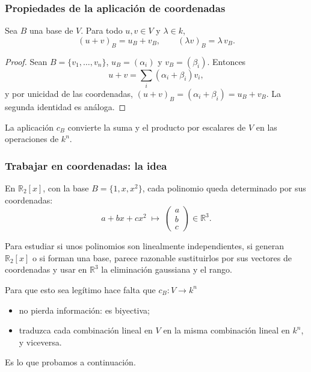 \begin{frame}
    \frametitle{Propiedades de la aplicación de coordenadas}

    \begin{proposition}
        Sea $B$ una base de $V$.
        Para todo $u,v\in V$ y $\lambda\in k$,
        \[
            (u+v)_B=u_B+v_B,
            \qquad
            (\lambda v)_B=\lambda\,v_B.
        \]
    \end{proposition}

    \begin{proof}
        Sean $B=\{v_1,\ldots,v_n\}$, $u_B=(\alpha_i)$ y $v_B=(\beta_i)$.
        Entonces
        \[
            u+v=\sum_i(\alpha_i+\beta_i)v_i,
        \]
        y por unicidad de las coordenadas,
        $(u+v)_B=(\alpha_i+\beta_i)=u_B+v_B$.
        La segunda identidad es análoga.
    \end{proof}

    \medskip

    La aplicación $c_B$ convierte la suma y el producto por escalares
    de $V$ en las operaciones de $k^n$.
\end{frame}


\begin{frame}
    \frametitle{Trabajar en coordenadas: la idea}

    En \(\mathbb{R}_2[x]\), con la base \(B=\{1,x,x^2\}\), cada polinomio
    queda determinado por sus coordenadas:
    \[
        a+bx+cx^2
        \;\longmapsto\;
        \begin{pmatrix}a\\b\\c\end{pmatrix}\in\mathbb{R}^3.
    \]

    \medskip

    Para estudiar si unos polinomios son linealmente independientes,
    si generan \(\mathbb{R}_2[x]\) o si forman una base, parece razonable
    \alert{sustituirlos por sus vectores de coordenadas} y usar en
    \(\mathbb{R}^3\) la eliminación gaussiana y el rango.

    \medskip

    Para que esto sea legítimo hace falta que \(c_B\colon V\to k^n\)
    \begin{itemize}
        \item no pierda información: \alert{es biyectiva};
        \item traduzca cada combinación lineal en \(V\) en la misma
              combinación lineal en \(k^n\), y viceversa.
    \end{itemize}
    Es lo que probamos a continuación.
\end{frame}



